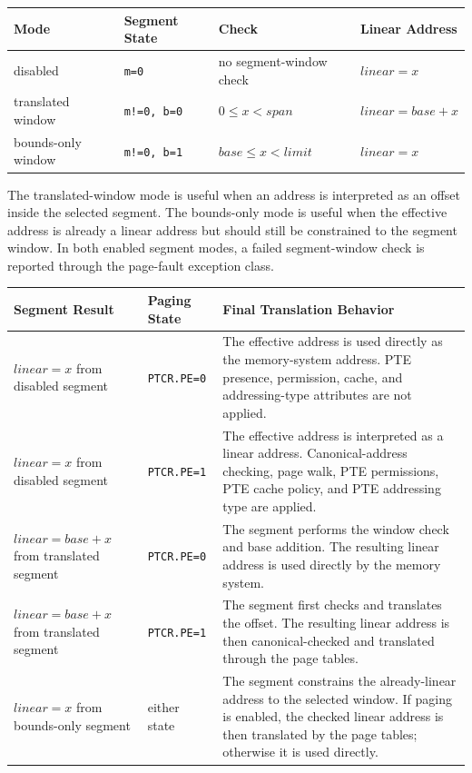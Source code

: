\begingroup\footnotesize
\begin{longtable}{@{}p{1.15in}p{1.0in}p{1.55in}p{1.80in}@{}}
\toprule
\textbf{Mode} & \textbf{Segment State} & \textbf{Check} & \textbf{Linear Address}\\
\midrule
\endhead
disabled & \texttt{m=0} & no segment-window check & \(\mathit{linear}=x\)\\
translated window & \texttt{m!=0, b=0} & \(0 \le x < \mathit{span}\) & \(\mathit{linear}=\mathit{base}+x\)\\
bounds-only window & \texttt{m!=0, b=1} & \(\mathit{base} \le x < \mathit{limit}\) & \(\mathit{linear}=x\)\\
\bottomrule
\end{longtable}
\endgroup

The translated-window mode is useful when an address is interpreted as an offset inside
the selected segment. The bounds-only mode is useful when the effective address is already
a linear address but should still be constrained to the segment window. In both enabled
segment modes, a failed segment-window check is reported through the page-fault exception
class.

\begingroup\footnotesize
\begin{longtable}{@{}p{1.15in}p{1.05in}p{3.25in}@{}}
\toprule
\textbf{Segment Result} & \textbf{Paging State} & \textbf{Final Translation Behavior}\\
\midrule
\endhead
\(\mathit{linear}=x\) from disabled segment & \texttt{PTCR.PE=0} & The effective address is used directly as the memory-system address. PTE presence, permission, cache, and addressing-type attributes are not applied.\\
\(\mathit{linear}=x\) from disabled segment & \texttt{PTCR.PE=1} & The effective address is interpreted as a linear address. Canonical-address checking, page walk, PTE permissions, PTE cache policy, and PTE addressing type are applied.\\
\(\mathit{linear}=\mathit{base}+x\) from translated segment & \texttt{PTCR.PE=0} & The segment performs the window check and base addition. The resulting linear address is used directly by the memory system.\\
\(\mathit{linear}=\mathit{base}+x\) from translated segment & \texttt{PTCR.PE=1} & The segment first checks and translates the offset. The resulting linear address is then canonical-checked and translated through the page tables.\\
\(\mathit{linear}=x\) from bounds-only segment & either state & The segment constrains the already-linear address to the selected window. If paging is enabled, the checked linear address is then translated by the page tables; otherwise it is used directly.\\
\bottomrule
\end{longtable}
\endgroup

